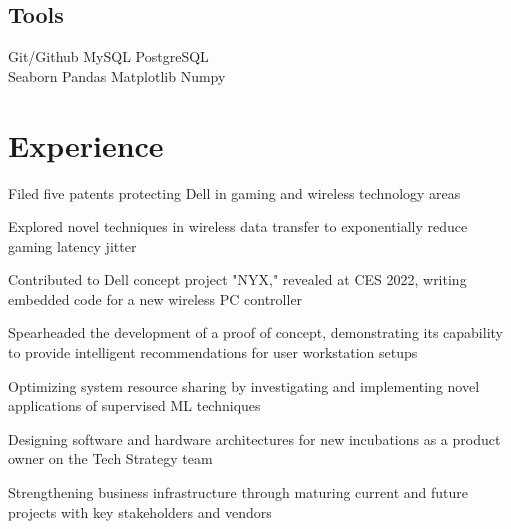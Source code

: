 \documentclass[]{resume-openfont}
\begin{document}
\begin{minipage}[t]{1\textwidth}
\begin{multicols}{3}
    \subsection{Tools}
    Git/Github\textbullet{} MySQL \textbullet{} PostgreSQL \\
    Seaborn \textbullet{} Pandas \textbullet{} Matplotlib \textbullet{} Numpy
    
    \vfill\null
    \columnbreak

\end{multicols}
\end{minipage} 

\vspace{-5 mm}
\begin{minipage}[t]{1\textwidth} 
\section{Experience}
\titlerule

\vspace{2.5 mm}
\vspace{\topsep}
\begin{tightemize}
\item Filed five patents protecting Dell in gaming and wireless technology areas
\item Explored novel techniques in wireless data transfer to exponentially reduce gaming latency jitter
\item Contributed to Dell concept project "NYX," revealed at CES 2022, writing embedded code for a new wireless PC controller
\item Spearheaded the development of a proof of concept, demonstrating its capability to provide intelligent recommendations for user workstation setups
\end{tightemize}
\sectionsep

\vspace{-2 mm}
\begin{tightemize}
\item Optimizing system resource sharing by investigating and implementing novel applications of supervised ML techniques
\item Designing software and hardware architectures for new incubations as a product owner on the Tech Strategy team
\item Strengthening business infrastructure through maturing current and future projects with key stakeholders and vendors
\end{tightemize}
\sectionsep


\end{minipage}
\end{document}
